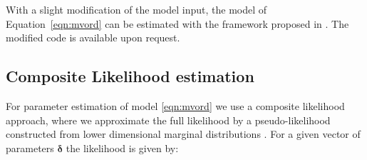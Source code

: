 \documentclass{article}
\newcommand{\COV}{\mathrm{cov}}
\begin{document}
With a slight modification of the model input, the model of Equation~\ref{eqn:mvord} can be estimated with the framework proposed in \cite{pub:mvord:Hirk+Hornik+Vana:2020}. The modified code is available upon request.
%
%
%
%



\subsection{Composite Likelihood estimation}
For parameter estimation of model \ref{eqn:mvord} we use a composite
likelihood approach, where we approximate the full likelihood by a
pseudo-likelihood constructed from lower dimensional
marginal distributions \citep{varin_overview}. For a given vector of parameters $\bm\delta$ the likelihood is given by:
\end{document}
